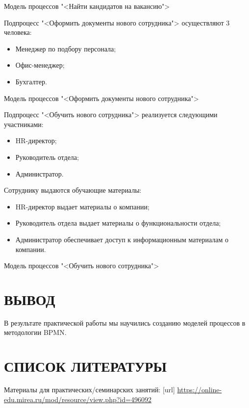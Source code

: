 \begin{image}
	\caption{Модель процессов "<Найти кандидатов на вакансию">}
\end{image}

Подпроцесс "<Оформить документы нового сотрудника"> осуществляют 3
человека:

\begin{itemize}
	\item Менеджер по подбору персонала;
	\item Офис-менеджер;
	\item Бухгалтер.
\end{itemize}

\begin{image}
	\caption{Модель процессов "<Оформить документы нового сотрудника">}
\end{image}


Подпроцесс "<Обучить нового сотрудника"> реализуется следующими
участниками:

\begin{itemize}
	\item HR-директор;
	\item Руководитель отдела;
	\item Администратор.
\end{itemize}

Сотруднику выдаются обучающие материалы:

\begin{itemize}
	\item HR-директор выдает материалы о компании;
	\item Руководитель отдела выдает материалы о функциональности отдела;
	\item Администратор обеспечивает доступ к информационным материалам о
		компании.
\end{itemize}

\begin{image}
	\caption{Модель процессов "<Обучить нового сотрудника">}
\end{image}

\clearpage

\section*{ВЫВОД}
В результате практической работы  мы научились
созданию моделей процессов в методологии BPMN.

\clearpage

\section*{СПИСОК ЛИТЕРАТУРЫ}
\begin{thebibliography}{}
    \bibitem{}  Материалы для практических/семинарских занятий: [url] 
		\url{https://online-edu.mirea.ru/mod/resource/view.php?id=496092}
\end{thebibliography}
